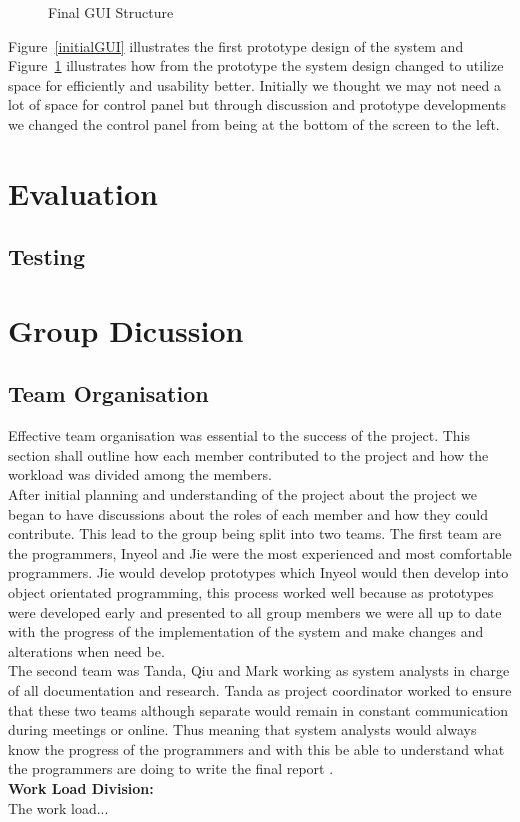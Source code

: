 \documentclass[11pt]{article}
\begin{document}
	\begin{figure}[h]
	\caption{Final GUI Structure}
	\label{finalGUI}
	\end{figure}
	Figure~\ref{initialGUI} illustrates the first prototype design of the system and Figure~\ref{finalGUI} illustrates how from the prototype the system design changed to utilize space for efficiently and usability better. 
	Initially we thought we may not need a lot of space for control panel but through discussion and prototype developments we changed the control panel from being at the bottom of the screen to the left. 
	
	\section{Evaluation} %
	\subsection{Testing} %
	\section{Group Dicussion}
	\subsection{Team Organisation} %
	Effective team organisation was essential to the success of the project. This section shall outline how each member contributed to the project and how the workload was divided among the members. \\
	After initial planning and understanding of the project about the project we began to have discussions about the roles of each member and how they could contribute. This lead to the group being split into two teams. The first team are the programmers, Inyeol and Jie were the most experienced and most comfortable programmers. Jie would develop prototypes which Inyeol would then develop into object orientated programming, this process worked well because as prototypes were developed early and presented to all group members we were all up to date with the progress of the implementation of the system and make changes and alterations when need be. \\
The second team was Tanda, Qiu and Mark working as system analysts in charge of all documentation and research. Tanda as project coordinator worked to ensure that these two teams although separate would remain in constant communication during meetings or online. Thus meaning that system analysts would always know the progress of the programmers and with this be able to understand what the programmers are doing to write the final report . \\
	\textbf{Work Load Division:}\\ 
	The work load...
	
\end{document}

